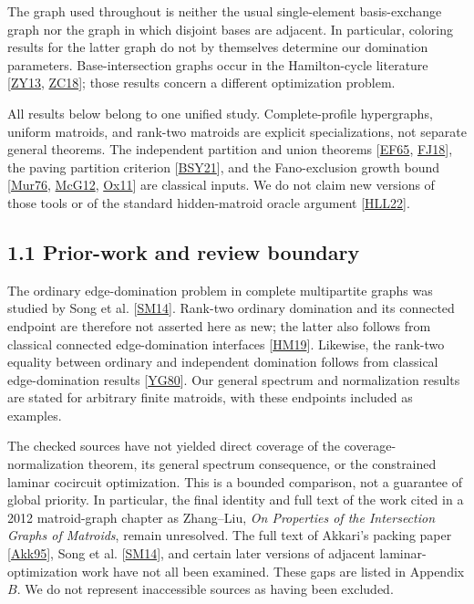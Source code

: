 \documentclass[11pt]{article}
\begin{document}
The graph used throughout is neither the usual single-element basis-exchange graph nor the graph in which disjoint bases are adjacent. In particular, coloring results for the latter graph do not by themselves determine our domination parameters. Base-intersection graphs occur in the Hamilton-cycle literature [\hyperlink{refZY13}{ZY13}, \hyperlink{refZC18}{ZC18}]; those results concern a different optimization problem.

All results below belong to one unified study. Complete-profile hypergraphs, uniform matroids, and rank-two matroids are explicit specializations, not separate general theorems. The independent partition and union theorems [\hyperlink{refEF65}{EF65}, \hyperlink{refFJ18}{FJ18}], the paving partition criterion [\hyperlink{refBSY21}{BSY21}], and the Fano-exclusion growth bound [\hyperlink{refMur76}{Mur76}, \hyperlink{refMcG12}{McG12}, \hyperlink{refOx11}{Ox11}] are classical inputs. We do not claim new versions of those tools or of the standard hidden-matroid oracle argument [\hyperlink{refHLL22}{HLL22}].

\subsection*{1.1 Prior-work and review boundary}

The ordinary edge-domination problem in complete multipartite graphs was studied by Song et al. [\hyperlink{refSM14}{SM14}]. Rank-two ordinary domination and its connected endpoint are therefore not asserted here as new; the latter also follows from classical connected edge-domination interfaces [\hyperlink{refHM19}{HM19}]. Likewise, the rank-two equality between ordinary and independent domination follows from classical edge-domination results [\hyperlink{refYG80}{YG80}]. Our general spectrum and normalization results are stated for arbitrary finite matroids, with these endpoints included as examples.

The checked sources have not yielded direct coverage of the coverage-normalization theorem, its general spectrum consequence, or the constrained laminar cocircuit optimization. This is a bounded comparison, not a guarantee of global priority. In particular, the final identity and full text of the work cited in a 2012 matroid-graph chapter as Zhang--Liu, \emph{On Properties of the Intersection Graphs of Matroids}, remain unresolved. The full text of Akkari's packing paper [\hyperlink{refAkk95}{Akk95}], Song et al. [\hyperlink{refSM14}{SM14}], and certain later versions of adjacent laminar-optimization work have not all been examined. These gaps are listed in Appendix \(B\). We do not represent inaccessible sources as having been excluded.
\end{document}
